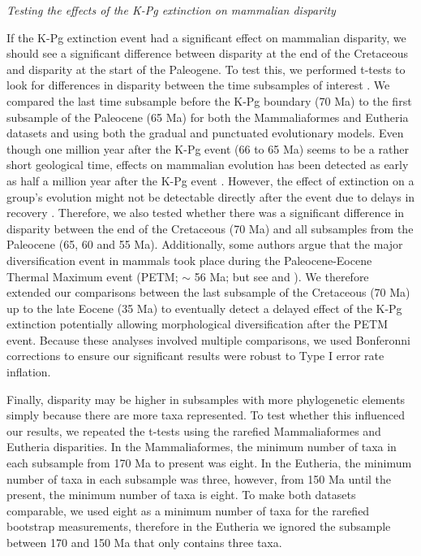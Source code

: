 \documentclass[12pt,letterpaper]{article}
\renewcommand{\subsection}[1]{%
\bigskip
\begin{center}
\begin{large}
\normalfont\itshape #1
\end{large}
\end{center}}
\begin{document}
\subsection{Testing the effects of the K-Pg extinction on mammalian disparity}
If the K-Pg extinction event had a significant effect on mammalian disparity, we should see a significant difference between disparity at the end of the Cretaceous and disparity at the start of the Paleogene.
To test this, we performed t-tests to look for differences in disparity between the time subsamples of interest \citep[e.g. as used in][]{anderson2012using,zelditch2012geometric,smith2014joined}.
We compared the last time subsample before the K-Pg boundary (70 Ma) to the first subsample of the Paleocene (65 Ma) for both the Mammaliaformes and Eutheria datasets and using both the gradual and punctuated evolutionary models.
Even though one million year after the K-Pg event (66 to 65 Ma) seems to be a rather short geological time, effects on mammalian evolution has been detected as early as half a million year after the K-Pg event \citep{Wilson2013}.
However, the effect of extinction on a group's evolution might not be detectable directly after the event due to delays in recovery \citep[e.g.][estimated that ecosystems only fully recovered 8-9 Ma after the Permo-Triassic mass extinction]{chen2012timing}.
Therefore, we also tested whether there was a significant difference in disparity between the end of the Cretaceous (70 Ma) and all subsamples from the Paleocene (65, 60 and 55 Ma).
Additionally, some authors argue that the major diversification event in mammals took place during the Paleocene-Eocene Thermal Maximum event (PETM; $\sim$ 56 Ma; \citealt{bininda2007delayed} but see \citealt{meredithimpacts2011} and \citealt{Stadler12042011}).
We therefore extended our comparisons between the last subsample of the Cretaceous (70 Ma) up to the late Eocene (35 Ma) to eventually detect a delayed effect of the K-Pg extinction potentially allowing morphological diversification after the PETM event. 
Because these analyses involved multiple comparisons, we used Bonferonni corrections \citep{holm1979simple} to ensure our significant results were robust to Type I error rate inflation. 

Finally, disparity may be higher in subsamples with more phylogenetic elements simply because there are more taxa represented.
To test whether this influenced our results, we repeated the t-tests using the rarefied Mammaliaformes and Eutheria disparities.
In the Mammaliaformes, the minimum number of taxa in each subsample from 170 Ma to present was eight.
In the Eutheria, the minimum number of taxa in each subsample was three, however, from 150 Ma until the present, the minimum number of taxa is eight.
To make both datasets comparable, we used eight as a minimum number of taxa for the rarefied bootstrap measurements, therefore in the Eutheria we ignored the subsample between 170 and 150 Ma that only contains three taxa.
\end{document}
